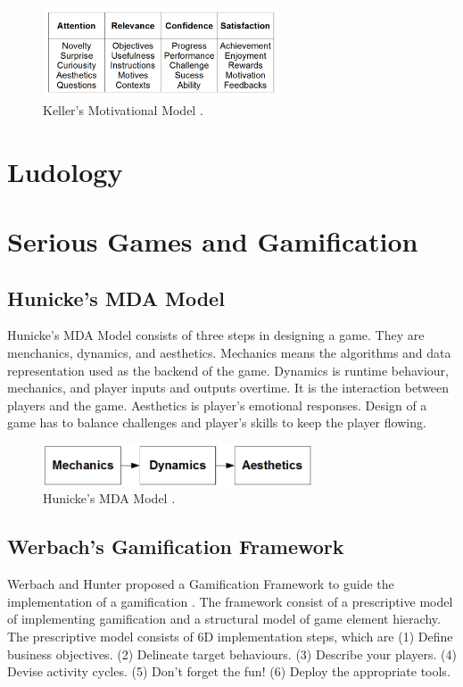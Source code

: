 \documentclass[12pt, a4paper]{report}
\begin{document}
\begin{figure}[ht]
\centering
\includegraphics[width=7cm]{keller}
\caption{Keller's Motivational Model \cite{keller2010motivational}.}
\label{fig:keller}
\end{figure}

\section{Ludology}

\section{Serious Games and Gamification}


\subsection{Hunicke's MDA Model}
Hunicke's MDA Model \cite{hunicke2004mda} consists of three steps in designing a game. They are menchanics, dynamics, and aesthetics. Mechanics means the algorithms and data representation used as the backend of the game. Dynamics is runtime behaviour, mechanics, and player inputs and outputs overtime. It is the interaction between players and the game. Aesthetics is player's emotional responses. Design of a  game has to balance challenges and player's skills to keep the player flowing.

\begin{figure}[ht]
\centering
\includegraphics[width=8cm]{mda}
\caption{Hunicke's MDA Model \cite{hunicke2004mda}.}
\label{fig:mda}
\end{figure}

\subsection{Werbach's Gamification Framework}
Werbach and Hunter proposed a Gamification Framework to guide the implementation of a gamification \cite{werbach2012win}. The framework consist of  a prescriptive model of implementing gamification and a structural model of game element hierachy. The prescriptive model consists of 6D implementation steps, which are (1) Define  business objectives. (2) Delineate target behaviours. (3) Describe your players. (4) Devise activity cycles. (5) Don't forget the fun! (6) Deploy the appropriate tools.
\end{document}

